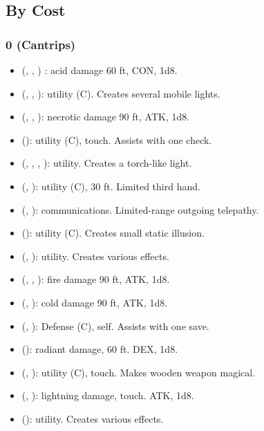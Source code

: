 \subsection{By Cost}
\subsubsection{0 (Cantrips)}
\begin{itemize}
	\item {} (, , ) : acid damage 60 ft, CON, 1d8.
	\item {} (, , ): utility (C). Creates several mobile lights.
	\item {} (, , ): necrotic damage 90 ft, ATK, 1d8.
	\item {} (): utility (C), touch. Assists with one check.
	\item {} (, , , ): utility. Creates a torch-like light.
	\item {} (, ): utility (C), 30 ft. Limited third hand.
	\item {} (, ): communications. Limited-range outgoing telepathy.
	\item {} (): utility (C). Creates small static illusion.
	\item {} (, ): utility. Creates various effects.
	\item {} (, , ): fire damage 90 ft, ATK, 1d8.
	\item {} (, ): cold damage 90 ft, ATK, 1d8.
	\item {} (, ): Defense (C), self. Assists with one save.
	\item {} (): radiant damage, 60 ft. DEX, 1d8.
	\item {} (, ): utility (C), touch. Makes wooden weapon magical.
	\item {} (, ): lightning damage, touch. ATK, 1d8.
	\item {} (): utility. Creates various effects.
\end{itemize}

